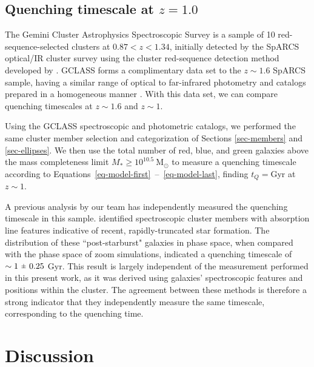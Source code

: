 \subsection{Quenching timescale at $z=1.0$}\label{sec-z1}

The Gemini Cluster Astrophysics Spectroscopic Survey \citep[GCLASS,][]{Muzzin:2012dw} is a sample of 10 red-sequence-selected clusters at $0.87 < z < 1.34$, initially detected by the SpARCS optical/IR cluster survey using the cluster red-sequence detection method developed by \cite{Gladders:2000rq} \citep[see][]{Muzzin:2009jm,Wilson:2009ws,Demarco:2010om}.
GCLASS forms a complimentary data set to the $z\sim1.6$ SpARCS sample, having a similar range of optical to far-infrared photometry and catalogs prepared in a homogeneous manner \citep[see][]{Muzzin:2012dw,van-der-Burg:2013zn,Nantais:2016aa,Nantais:2017aa}.
With this data set, we can compare quenching timescales at $z\sim1.6$ and $z\sim1$.

Using the GCLASS spectroscopic and photometric catalogs, we performed the same cluster member selection and categorization of Sections \ref{sec-members} and \ref{sec-ellipses}.
We then use the total number of red, blue, and green galaxies above the mass completeness limit $M_* \geq 10^{10.5}~\mathrm{M}_\odot$ to measure a quenching timescale according to Equations~\eqref{eq-model-first}~--~\eqref{eq-model-last}, finding $t_Q=$\gresult Gyr at $z\sim1$.

A previous analysis by our team has independently measured the quenching timescale in this sample.
\citet{Muzzin:2014aa} identified spectroscopic cluster members with absorption line features indicative of recent, rapidly-truncated star formation.
The distribution of these ``post-starburst" galaxies in phase space, when compared with the phase space of zoom simulations, indicated a quenching timescale of $\sim1\ \rpm\ 0.25$ Gyr.
This result is largely independent of the measurement performed in this present work, as it was derived using galaxies' spectroscopic features and positions within the cluster.
The agreement between these methods is therefore a strong indicator that they independently measure the same timescale, corresponding to the quenching time.

\section{Discussion}\label{sec-discussion}


